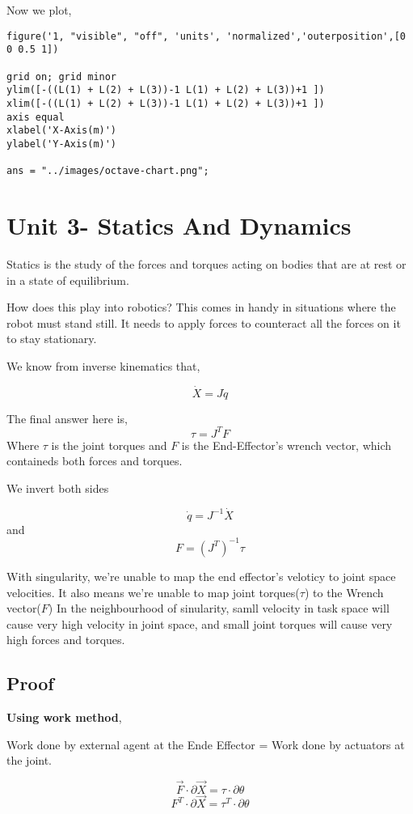 \documentclass[11pt]{report}
\begin{document}
\begin{enumerate}
\begin{enumerate}
\begin{enumerate}
Now we plot,
\begin{verbatim}
figure('1, "visible", "off", 'units', 'normalized','outerposition',[0 0 0.5 1])

grid on; grid minor
ylim([-((L(1) + L(2) + L(3))-1 L(1) + L(2) + L(3))+1 ])
xlim([-((L(1) + L(2) + L(3))-1 L(1) + L(2) + L(3))+1 ])
axis equal
xlabel('X-Axis(m)')
ylabel('Y-Axis(m)')

ans = "../images/octave-chart.png";
\end{verbatim}
\end{enumerate}
\end{enumerate}
\end{enumerate}
\chapter{Unit 3- Statics And Dynamics}
\label{sec:org5ed8d5a}
Statics is the study of the forces and torques acting on bodies that are at rest or in a state of equilibrium.

How does this play into robotics? This comes in handy in situations where the robot must stand still. It needs to apply forces to counteract all the forces on it to stay stationary.

We know from inverse kinematics that,

$$\dot{X} = J \dot{q}$$

The final answer here is,
$$\tau = J^TF$$
Where \(\tau\) is the joint torques and \(F\) is the End-Effector's wrench vector, which containeds both forces and torques.

We invert both sides

$$\dot{q} = J^{-1}\dot{X}$$ and $$F = (J^T)^{-1}\tau$$

With singularity, we're unable to map the end effector's veloticy to joint space velocities. It also means we're unable to map joint torques(\(\tau\)) to the Wrench vector(\(F\)) In the neighbourhood of  sinularity, samll velocity in task space will cause very high velocity in joint space, and small joint torques will cause very high forces and torques.
\section{Proof}
\label{sec:org54701b2}
\textbf{Using work method},

Work done by external agent at the Ende Effector = Work done by actuators at the joint.

$$\vec{F} \cdot \partial {\vec{X}} = \tau \cdot \partial \theta $$
$${F}^{T} \cdot \partial {\vec{X}} = \tau^{T} \cdot \partial \theta $$
\end{document}
